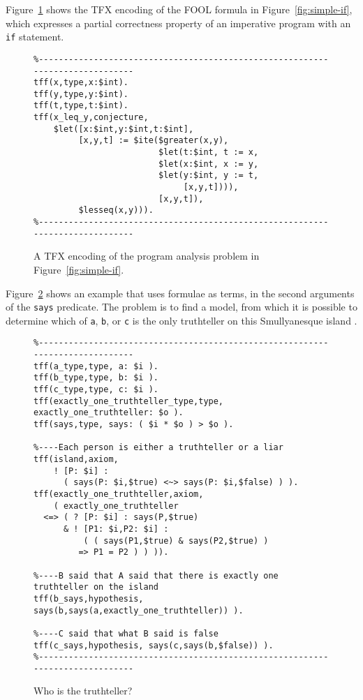 \documentclass{easychair}
\begin{document}
Figure~\ref{LetITE} shows the TFX encoding of the FOOL formula in
Figure~\ref{fig:simple-if}, which expresses a partial correctness property 
of an imperative program with an \texttt{if} statement.

\begin{figure}[htbp]
\begin{small}
\begin{verbatim}
%------------------------------------------------------------------------------
tff(x,type,x:$int).
tff(y,type,y:$int).
tff(t,type,t:$int).
tff(x_leq_y,conjecture,
    $let([x:$int,y:$int,t:$int],
         [x,y,t] := $ite($greater(x,y),
                         $let(t:$int, t := x,
                         $let(x:$int, x := y,
                         $let(y:$int, y := t,
                              [x,y,t]))),
                         [x,y,t]),
         $lesseq(x,y))).
%------------------------------------------------------------------------------
\end{verbatim}
\end{small}
\caption{A TFX encoding of the program analysis problem in
Figure~\ref{fig:simple-if}.}
\label{LetITE}
\end{figure}

Figure~\ref{Truthteller} shows an example that uses formulae as terms, in
the second arguments of the {\tt says} predicate.
The problem is to find a model, from which it is possible to determine which
of {\tt a}, {\tt b}, or {\tt c} is the only truthteller on this
Smullyanesque island \cite{Smu78}.

\begin{figure}[htbp]
\begin{small}
\begin{verbatim}
%------------------------------------------------------------------------------
tff(a_type,type, a: $i ).
tff(b_type,type, b: $i ).
tff(c_type,type, c: $i ).
tff(exactly_one_truthteller_type,type, exactly_one_truthteller: $o ).
tff(says,type, says: ( $i * $o ) > $o ).

%----Each person is either a truthteller or a liar
tff(island,axiom,
    ! [P: $i] :
      ( says(P: $i,$true) <~> says(P: $i,$false) ) ).
tff(exactly_one_truthteller,axiom,
    ( exactly_one_truthteller
  <=> ( ? [P: $i] : says(P,$true)
      & ! [P1: $i,P2: $i] :
          ( ( says(P1,$true) & says(P2,$true) )
         => P1 = P2 ) ) )).

%----B said that A said that there is exactly one truthteller on the island
tff(b_says,hypothesis, says(b,says(a,exactly_one_truthteller)) ).

%----C said that what B said is false
tff(c_says,hypothesis, says(c,says(b,$false)) ).
%------------------------------------------------------------------------------
\end{verbatim}
\end{small}
\caption{Who is the truthteller?}
\label{Truthteller}
\end{figure}
\end{document}
